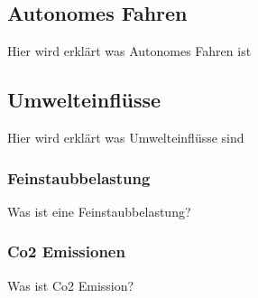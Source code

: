 	      	      	      	      	      
\subsection{Autonomes Fahren}
	      	      	      	      	      
Hier wird erklärt was Autonomes Fahren ist
	      	      	      	      	      
	      	      	      	      	      
\subsection{Umwelteinflüsse}
	      	      	      	      	      
Hier wird erklärt was Umwelteinflüsse sind
\subsubsection{Feinstaubbelastung}
Was ist eine Feinstaubbelastung?
\subsubsection{Co2 Emissionen}
Was ist Co2 Emission?
